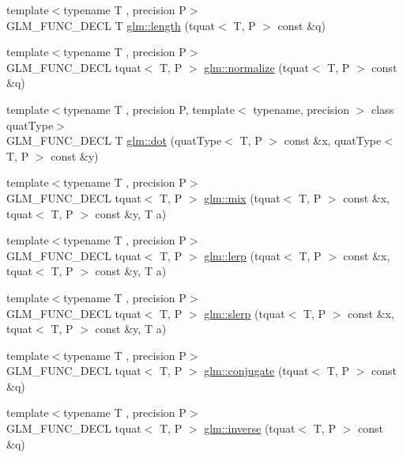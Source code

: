 \begin{DoxyCompactItemize}
\item 
{\footnotesize template$<$typename T , precision P$>$ }\\G\-L\-M\-\_\-\-F\-U\-N\-C\-\_\-\-D\-E\-C\-L T \hyperlink{group__gtc__quaternion_gac682181783027544c8d251b4d3a60cf8}{glm\-::length} (tquat$<$ T, P $>$ const \&q)
\item 
{\footnotesize template$<$typename T , precision P$>$ }\\G\-L\-M\-\_\-\-F\-U\-N\-C\-\_\-\-D\-E\-C\-L tquat$<$ T, P $>$ \hyperlink{group__gtc__quaternion_ga35b6bcb22ac6d1e4a85440f5b69bdf86}{glm\-::normalize} (tquat$<$ T, P $>$ const \&q)
\item 
{\footnotesize template$<$typename T , precision P, template$<$ typename, precision $>$ class quat\-Type$>$ }\\G\-L\-M\-\_\-\-F\-U\-N\-C\-\_\-\-D\-E\-C\-L T \hyperlink{group__gtc__quaternion_gac54dfc83de465a2d03e90d342242ab3d}{glm\-::dot} (quat\-Type$<$ T, P $>$ const \&x, quat\-Type$<$ T, P $>$ const \&y)
\item 
{\footnotesize template$<$typename T , precision P$>$ }\\G\-L\-M\-\_\-\-F\-U\-N\-C\-\_\-\-D\-E\-C\-L tquat$<$ T, P $>$ \hyperlink{group__gtc__quaternion_ga31cc82178742c36450f5662bd4fb30b0}{glm\-::mix} (tquat$<$ T, P $>$ const \&x, tquat$<$ T, P $>$ const \&y, T a)
\item 
{\footnotesize template$<$typename T , precision P$>$ }\\G\-L\-M\-\_\-\-F\-U\-N\-C\-\_\-\-D\-E\-C\-L tquat$<$ T, P $>$ \hyperlink{group__gtc__quaternion_ga5692804fa4db9e762a1c19b607e54435}{glm\-::lerp} (tquat$<$ T, P $>$ const \&x, tquat$<$ T, P $>$ const \&y, T a)
\item 
{\footnotesize template$<$typename T , precision P$>$ }\\G\-L\-M\-\_\-\-F\-U\-N\-C\-\_\-\-D\-E\-C\-L tquat$<$ T, P $>$ \hyperlink{group__gtc__quaternion_ga22b438c7252f3fa5b773c9882471652a}{glm\-::slerp} (tquat$<$ T, P $>$ const \&x, tquat$<$ T, P $>$ const \&y, T a)
\item 
{\footnotesize template$<$typename T , precision P$>$ }\\G\-L\-M\-\_\-\-F\-U\-N\-C\-\_\-\-D\-E\-C\-L tquat$<$ T, P $>$ \hyperlink{group__gtc__quaternion_gab1ace864fbf189ffa368950001808a3c}{glm\-::conjugate} (tquat$<$ T, P $>$ const \&q)
\item 
{\footnotesize template$<$typename T , precision P$>$ }\\G\-L\-M\-\_\-\-F\-U\-N\-C\-\_\-\-D\-E\-C\-L tquat$<$ T, P $>$ \hyperlink{group__gtc__quaternion_ga5f47300c024c2d809944e6ac661d6d14}{glm\-::inverse} (tquat$<$ T, P $>$ const \&q)

\end{DoxyCompactItemize}
